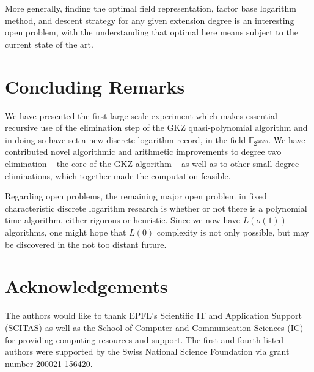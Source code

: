 \documentclass[11pt]{llncs}
\newcommand{\F}{\mathbb F}
\begin{document}
More generally, finding the optimal field representation, factor base logarithm method, and descent strategy for any given extension degree is an interesting open problem, with the understanding that optimal here means subject to the current state of the art.


\section{Concluding Remarks}\label{sec:conclusion}

We have presented the first large-scale experiment which makes essential recursive use of the elimination step of the GKZ quasi-polynomial algorithm and 
in doing so have set a new discrete logarithm record, in the field $\F_{2^{30750}}$. We have contributed novel algorithmic and arithmetic improvements 
to degree two elimination -- the core of the GKZ algorithm -- as well as to other small degree eliminations, which together made the computation feasible. 

Regarding open problems, the remaining major open problem in fixed characteristic discrete logarithm research is whether or not there is a polynomial time 
algorithm, either rigorous or heuristic. Since we now have $L(o(1))$ algorithms, one might hope that $L(0)$ complexity is not only possible, but may be discovered in the not too distant future. 


\section*{Acknowledgements}

The authors would like to thank EPFL's Scientific IT and Application Support (SCITAS) as well as the School of Computer and
Communication Sciences (IC) for providing computing resources and support.
The first and fourth listed authors were supported by the Swiss National Science Foundation via grant number 200021-156420.

\end{document}
